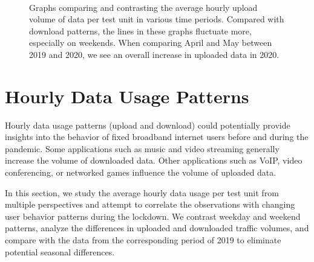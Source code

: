 \begin{figure}[th]
{    }
    \\
    \hspace*{\fill}

    \caption{Graphs comparing and contrasting the average hourly upload volume of data per test unit in various time periods. Compared with download patterns, the lines in these graphs fluctuate more, especially on weekends. When comparing April and May between 2019 and 2020, we see an overall increase in uploaded data in 2020.}
  \label{fig:upload_data_per_user_hours_fig}
\end{figure}


\section{Hourly Data Usage Patterns}\label{sec:hourly-data-usage-patterns}

Hourly data usage patterns (upload and download) could potentially provide insights into the behavior of fixed broadband internet users before and during the pandemic. Some applications such as music and video streaming generally increase the volume of downloaded data. Other applications such as \gls{VoIP}, video conferencing, or networked games influence the volume of uploaded data.

In this section, we study the average hourly data usage per test unit from multiple perspectives and attempt to correlate the observations with changing user behavior patterns during the lockdown. We contrast weekday and weekend patterns, analyze the differences in uploaded and downloaded traffic volumes, and compare with the data from the corresponding period of 2019 to eliminate potential seasonal differences.

